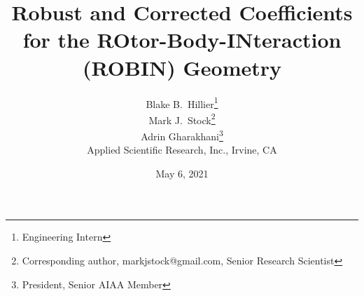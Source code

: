 \documentclass[12pt]{article}
\title{Robust and Corrected Coefficients for the ROtor-Body-INteraction (ROBIN) Geometry}
\author{Blake B.~Hillier\footnote{Engineering Intern} \\
        Mark J.~Stock\footnote{Corresponding author, markjstock@gmail.com, Senior Research Scientist} \\
        Adrin Gharakhani\footnote{President, Senior AIAA Member} \\
        Applied Scientific Research, Inc., Irvine, CA}
\begin{document}
\date{May 6, 2021}
\maketitle


%

\end{document}
